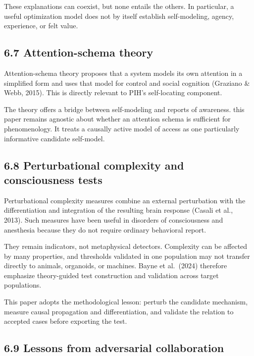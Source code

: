 \documentclass[
  11pt,
]{article}
\begin{document}
These explanations can coexist, but none entails the others. In
particular, a useful optimization model does not by itself establish
self-modeling, agency, experience, or felt value.

\subsection{6.7 Attention-schema theory}\label{attention-schema-theory}

Attention-schema theory proposes that a system models its own attention
in a simplified form and uses that model for control and social
cognition (Graziano \& Webb, 2015). This is directly relevant to PIH's
self-locating component.

The theory offers a bridge between self-modeling and reports of
awareness. this paper remains agnostic about whether an attention schema
is sufficient for phenomenology. It treats a causally active model of
access as one particularly informative candidate self-model.

\subsection{6.8 Perturbational complexity and consciousness
tests}\label{perturbational-complexity-and-consciousness-tests}

Perturbational complexity measures combine an external perturbation with
the differentiation and integration of the resulting brain response
(Casali et al., 2013). Such measures have been useful in disorders of
consciousness and anesthesia because they do not require ordinary
behavioral report.

They remain indicators, not metaphysical detectors. Complexity can be
affected by many properties, and thresholds validated in one population
may not transfer directly to animals, organoids, or machines. Bayne et
al.~(2024) therefore emphasize theory-guided test construction and
validation across target populations.

This paper adopts the methodological lesson: perturb the candidate
mechanism, measure causal propagation and differentiation, and validate
the relation to accepted cases before exporting the test.

\subsection{6.9 Lessons from adversarial
collaboration}\label{lessons-from-adversarial-collaboration}
\end{document}
